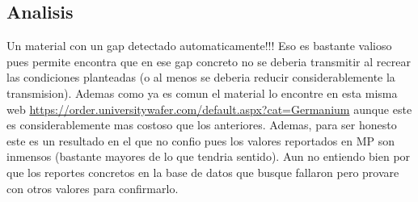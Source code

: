\subsection*{Analisis}

Un material con un gap detectado automaticamente!!! Eso es bastante valioso pues permite encontra que en ese gap concreto no se deberia transmitir al recrear las condiciones planteadas (o al menos se deberia reducir considerablemente la transmision). Ademas como ya es comun el material lo encontre en esta misma web \url{https://order.universitywafer.com/default.aspx?cat=Germanium} aunque este es considerablemente mas costoso que los anteriores. Ademas, para ser honesto este es un resultado en el que no confio pues los valores reportados en MP son inmensos (bastante mayores de lo que tendria sentido). Aun no entiendo bien por que los reportes concretos en la base de datos que busque fallaron pero provare con otros valores para confirmarlo.

\clearpage
